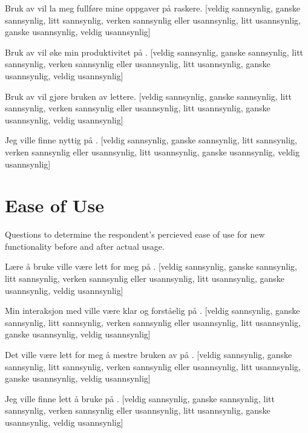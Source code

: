\begin{items}
  \item Bruk av \siste{} vil la meg fullføre mine oppgaver på \urort{}
    raskere.
    [veldig sannsynlig, ganske sannsynlig, litt sannsynlig,
    verken sannsynlig eller usannsynlig,
    litt usannsynlig, ganske usannsynlig, veldig usannsynlig]
  \item Bruk av \siste{} vil øke min produktivitet på \urort{}.
    [veldig sannsynlig, ganske sannsynlig, litt sannsynlig,
    verken sannsynlig eller usannsynlig,
    litt usannsynlig, ganske usannsynlig, veldig usannsynlig]
  \item Bruk av \siste{} vil gjøre bruken av \urort{} lettere.
    [veldig sannsynlig, ganske sannsynlig, litt sannsynlig,
    verken sannsynlig eller usannsynlig,
    litt usannsynlig, ganske usannsynlig, veldig usannsynlig]
  \item Jeg ville finne \siste{} nyttig på \urort{}.
    [veldig sannsynlig, ganske sannsynlig, litt sannsynlig,
    verken sannsynlig eller usannsynlig,
    litt usannsynlig, ganske usannsynlig, veldig usannsynlig]
\end{items}

\section{Ease of Use}

Questions to determine the respondent's percieved ease of use for new
functionality before and after actual usage.

\begin{items}
  \item Lære å bruke \siste{} ville være lett for meg på \urort{}.
    [veldig sannsynlig, ganske sannsynlig, litt sannsynlig,
    verken sannsynlig eller usannsynlig,
    litt usannsynlig, ganske usannsynlig, veldig usannsynlig]
  \item Min interaksjon med \siste{} ville være klar og forståelig
    på \urort{}.
    [veldig sannsynlig, ganske sannsynlig, litt sannsynlig,
    verken sannsynlig eller usannsynlig,
    litt usannsynlig, ganske usannsynlig, veldig usannsynlig]
  \item Det ville være lett for meg å mestre bruken av \siste{}
    på \urort{}.
    [veldig sannsynlig, ganske sannsynlig, litt sannsynlig,
    verken sannsynlig eller usannsynlig,
    litt usannsynlig, ganske usannsynlig, veldig usannsynlig]
  \item Jeg ville finne \siste{} lett å bruke på \urort{}.
    [veldig sannsynlig, ganske sannsynlig, litt sannsynlig,
    verken sannsynlig eller usannsynlig,
    litt usannsynlig, ganske usannsynlig, veldig usannsynlig]
\end{items}


